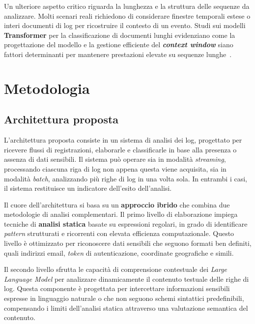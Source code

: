\documentclass[12pt,twoside]{report}
\begin{document}
Un ulteriore aspetto critico riguarda la lunghezza e la struttura delle sequenze da analizzare. Molti scenari reali richiedono di considerare finestre temporali estese o interi documenti di log per ricostruire il contesto di un evento. Studi sui modelli \textbf{Transformer} per la classificazione di documenti lunghi evidenziano come la progettazione del modello e la gestione efficiente del \textbf{\textit{context window}} siano fattori determinanti per mantenere prestazioni elevate su sequenze lunghe~\cite{dai2022revisiting_long_doc}.



%
%

\cleardoublepage
\chapter{Metodologia}
\label{chap:metodologia}

\section{Architettura proposta}
\label{sec:architettura_proposta}

L'architettura proposta consiste in un sistema di analisi dei log, progettato per ricevere flussi di registrazioni, elaborarle e classificarle in base alla presenza o assenza di dati sensibili. Il sistema può operare sia in modalità \textit{streaming}, processando ciascuna riga di log non appena questa viene acquisita, sia in modalità \textit{batch}, analizzando più righe di log in una volta sola. In entrambi i casi, il sistema restituisce un indicatore dell'esito dell'analisi.

Il cuore dell'architettura si basa su un \textbf{approccio ibrido} che combina due metodologie di analisi complementari. Il primo livello di elaborazione impiega tecniche di \textbf{analisi statica} basate su espressioni regolari, in grado di identificare \textit{pattern} strutturati e ricorrenti con elevata efficienza computazionale. Questo livello è ottimizzato per riconoscere dati sensibili che seguono formati ben definiti, quali indirizzi email, \textit{token} di autenticazione, coordinate geografiche e simili.

Il secondo livello sfrutta le capacità di comprensione contestuale dei \textit{Large Language Model} per analizzare dinamicamente il contenuto testuale delle righe di log. Questa componente è progettata per intercettare informazioni sensibili espresse in linguaggio naturale o che non seguono schemi sintattici predefinibili, compensando i limiti dell'analisi statica attraverso una valutazione semantica del contenuto.
\end{document}
